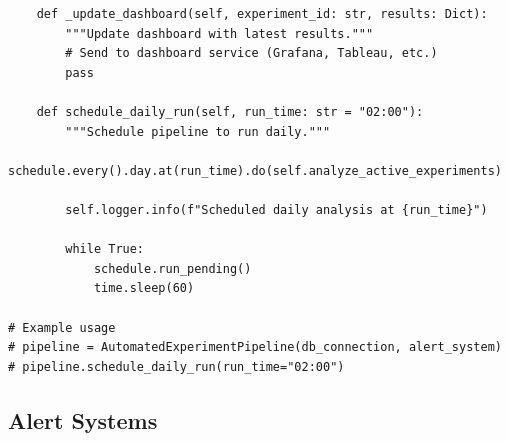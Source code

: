 \begin{lstlisting}
    def _update_dashboard(self, experiment_id: str, results: Dict):
        """Update dashboard with latest results."""
        # Send to dashboard service (Grafana, Tableau, etc.)
        pass

    def schedule_daily_run(self, run_time: str = "02:00"):
        """Schedule pipeline to run daily."""
        schedule.every().day.at(run_time).do(self.analyze_active_experiments)

        self.logger.info(f"Scheduled daily analysis at {run_time}")

        while True:
            schedule.run_pending()
            time.sleep(60)

# Example usage
# pipeline = AutomatedExperimentPipeline(db_connection, alert_system)
# pipeline.schedule_daily_run(run_time="02:00")
\end{lstlisting}

\subsection{Alert Systems}

